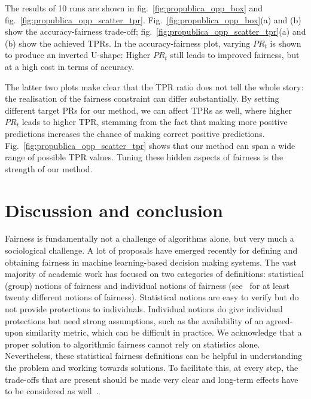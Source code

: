 The results of 10 runs are shown in fig.~\ref{fig:propublica_opp_box} and fig.~\ref{fig:propublica_opp_scatter_tpr}.
Fig.~\ref{fig:propublica_opp_box}(a) and (b) show the accuracy-fairness trade-off;
fig.~\ref{fig:propublica_opp_scatter_tpr}(a) and (b) show the achieved TPRs.
In the accuracy-fairness plot, varying $\mathit{PR}_t$ is shown to produce an inverted U-shape:
Higher $\mathit{PR}_t$ still leads to improved fairness, but at a high cost in terms of accuracy.

The latter two plots make clear that the TPR ratio does not tell the whole story:
the realisation of the fairness constraint can differ substantially.
By setting different target PRs for our method, we can affect TPRs as well,
where higher $\mathit{PR}_t$ leads to higher TPR,
stemming from the fact that making more positive predictions increases the chance of making correct positive predictions.
Fig.~\ref{fig:propublica_opp_scatter_tpr} shows that our method can span a wide range of possible TPR values.
Tuning these hidden aspects of fairness is the strength of our method.

\section{Discussion and conclusion}\label{sec:paper1-discussion}
Fairness is fundamentally not a challenge of algorithms alone, but very much a sociological challenge.
%
A lot of proposals have emerged recently for defining and obtaining fairness in machine learning-based decision making systems. 
%
The vast majority of academic work has focused on two categories of definitions: statistical (group) notions of fairness and individual notions of fairness (see~\citet{verma2018fairness} for at least twenty different notions of fairness).
%
Statistical notions are easy to verify but do not provide protections to individuals. 
%
Individual notions do give individual protections but need strong assumptions, such as the availability of an agreed-upon similarity metric, which can be difficult in practice.
%
We acknowledge that a proper solution to algorithmic fairness cannot rely on statistics alone.
%
Nevertheless, these statistical fairness definitions can be helpful in understanding the problem and working towards solutions.
%
To facilitate this, at every step, the trade-offs that are present should be made very clear
and long-term effects have to be considered as well~\citep{liu2018delayed,kallus2018residual}.

